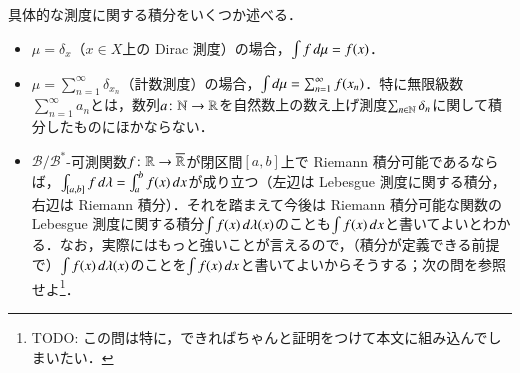 \begin{exm}具体的な測度に関する積分をいくつか述べる．
\begin{itemize}
\item $\mu = \delta_x$（$x \in X$上の Dirac 測度）の場合，$\int f \mathop{}\!d \mu = f(x)$．
\item $\mu = \sum_{n=1}^\infty \delta_{x_n}$（計数測度）の場合，$\int \mathop{}\!d \mu = \sum_{n=1}^\infty f(x_n)$．特に無限級数$\sum_{n=1}^\infty a_n$とは，数列$a \colon \mathbb{N} \to \mathbb{R}$を自然数上の数え上げ測度$\sum_{n \in \mathbb{N}} \delta_n$に関して積分したものにほかならない．
\item $\mathcal{B}/\mathcal{B}^*$-可測関数$f \colon \mathbb{R} \to \overline{\mathbb{R}}$が閉区間$[a,b]$上で Riemann 積分可能であるならば，$\int_{[a,b]} f \mathop{}\!d \lambda = \int_a^b f(x) \mathop{}\!d x$が成り立つ（左辺は Lebesgue 測度に関する積分，右辺は Riemann 積分）．それを踏まえて今後は Riemann 積分可能な関数の Lebesgue 測度に関する積分$\int f(x) \mathop{}\!d \lambda(x)$のことも$\int f(x)\mathop{}\!d x$と書いてよいとわかる．なお，実際にはもっと強いことが言えるので，（積分が定義できる前提で）$\int f(x) \mathop{}\!d \lambda(x)$のことを$\int f(x)\mathop{}\!d x$と書いてよいからそうする；次の問を参照せよ\footnote{TODO: この問は特に，できればちゃんと証明をつけて本文に組み込んでしまいたい．}．
\end{itemize}
\end{exm}

